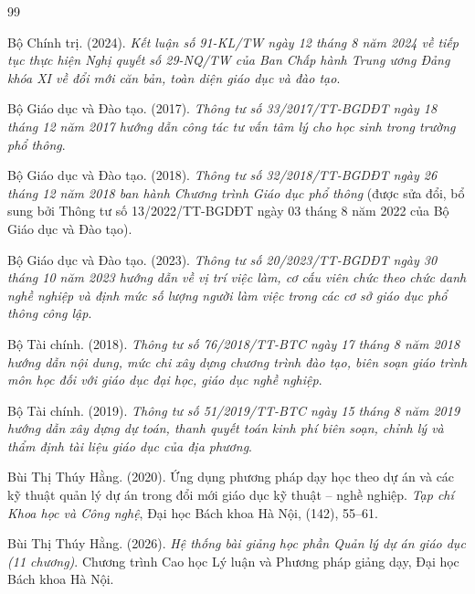 \renewcommand{\refname}{DANH MỤC TÀI LIỆU THAM KHẢO}

\setlength{\bibhang}{1.27cm}
\setlength{\bibsep}{6pt}

\begin{thebibliography}{99}

Bộ Chính trị. (2024). \textit{Kết luận số 91-KL/TW ngày 12 tháng 8 năm 2024 về tiếp tục thực hiện Nghị quyết số 29-NQ/TW của Ban Chấp hành Trung ương Đảng khóa XI về đổi mới căn bản, toàn diện giáo dục và đào tạo}.

Bộ Giáo dục và Đào tạo. (2017). \textit{Thông tư số 33/2017/TT-BGDĐT ngày 18 tháng 12 năm 2017 hướng dẫn công tác tư vấn tâm lý cho học sinh trong trường phổ thông}.

Bộ Giáo dục và Đào tạo. (2018). \textit{Thông tư số 32/2018/TT-BGDĐT ngày 26 tháng 12 năm 2018 ban hành Chương trình Giáo dục phổ thông} (được sửa đổi, bổ sung bởi Thông tư số 13/2022/TT-BGDĐT ngày 03 tháng 8 năm 2022 của Bộ Giáo dục và Đào tạo).

Bộ Giáo dục và Đào tạo. (2023). \textit{Thông tư số 20/2023/TT-BGDĐT ngày 30 tháng 10 năm 2023 hướng dẫn về vị trí việc làm, cơ cấu viên chức theo chức danh nghề nghiệp và định mức số lượng người làm việc trong các cơ sở giáo dục phổ thông công lập}.

Bộ Tài chính. (2018). \textit{Thông tư số 76/2018/TT-BTC ngày 17 tháng 8 năm 2018 hướng dẫn nội dung, mức chi xây dựng chương trình đào tạo, biên soạn giáo trình môn học đối với giáo dục đại học, giáo dục nghề nghiệp}.

Bộ Tài chính. (2019). \textit{Thông tư số 51/2019/TT-BTC ngày 15 tháng 8 năm 2019 hướng dẫn xây dựng dự toán, thanh quyết toán kinh phí biên soạn, chỉnh lý và thẩm định tài liệu giáo dục của địa phương}.

Bùi Thị Thúy Hằng. (2020). Ứng dụng phương pháp dạy học theo dự án và các kỹ thuật quản lý dự án trong đổi mới giáo dục kỹ thuật -- nghề nghiệp. \textit{Tạp chí Khoa học và Công nghệ}, Đại học Bách khoa Hà Nội, (142), 55--61.

Bùi Thị Thúy Hằng. (2026). \textit{Hệ thống bài giảng học phần Quản lý dự án giáo dục (11 chương)}. Chương trình Cao học Lý luận và Phương pháp giảng dạy, Đại học Bách khoa Hà Nội.


\end{thebibliography}
